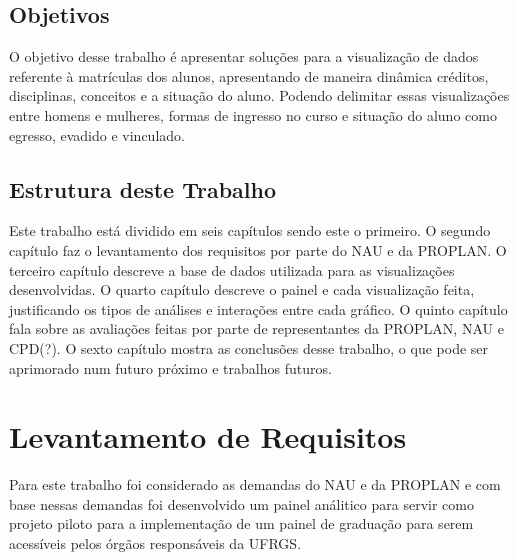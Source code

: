\documentclass[cic,tc]{iiufrgs}
\begin{document}
\section{Objetivos}\label{cap_1_2_objet}
O objetivo desse trabalho é apresentar soluções para a visualização de dados referente à matrículas dos alunos, apresentando de maneira dinâmica créditos, disciplinas, conceitos e a situação do aluno. Podendo delimitar essas visualizações entre homens e mulheres, formas de ingresso no curso e situação do aluno como egresso, evadido e vinculado.

\section{Estrutura deste Trabalho}\label{cap_1_4_estrut}
Este trabalho está dividido em seis capítulos sendo este o primeiro. O segundo capítulo faz o levantamento dos requisitos por parte do NAU e da PROPLAN. O terceiro capítulo descreve a base de dados utilizada para as visualizações desenvolvidas. O quarto capítulo descreve o painel e cada visualização feita, justificando os tipos de análises e interações entre cada gráfico. O quinto capítulo fala sobre as avaliações feitas por parte de representantes da PROPLAN, NAU e CPD(?). O sexto capítulo mostra as conclusões desse trabalho, o que pode ser aprimorado num futuro próximo e trabalhos futuros.

\chapter{Levantamento de Requisitos}\label{cap_2_trabs_rel}
Para este trabalho foi considerado as demandas do NAU e da PROPLAN e com base nessas demandas foi desenvolvido um painel análitico para servir como projeto piloto para a implementação de um painel de graduação para serem acessíveis pelos órgãos responsáveis da UFRGS.
\end{document}
